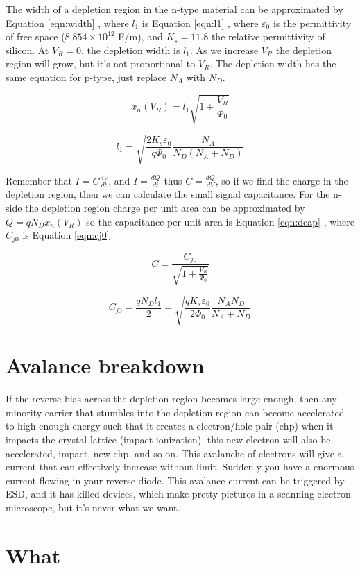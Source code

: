 \documentclass[technote,10pt,a4paper]{IEEEtran}
\newcommand{\req}[1]{Equation \ref{eqn:#1} }
\newcommand{\eqnr}[2]{
  \begin{equation}
    #1
    \label{eqn:#2}
  \end{equation}}
\begin{document}
The width of a depletion region in the n-type material can be approximated by
\req{width}, where $l_{1}$ is \req{l1},
where $\varepsilon_{0}$ is the permittivity of free space
($8.854 \times 10^{12} $ F/m), and $K_{s} = 11.8$ the relative
permittivity of silicon. At $V_{R} = 0$, the depletion width is $l_{1}$. As we
increase $V_{R}$ the depletion region will grow, but it's not proportional to
$V_{R}$. The depletion width has the same equation for  p-type, just
replace $N_{A}$ with $N_{D}$.

\eqnr{ x_n(V_R) = l_1 \sqrt{1 + \frac{V_R}{\Phi_0}} }{width}

\eqnr{ l_1 = \sqrt{\frac{2K_s\varepsilon_0}{q\Phi_0}\frac{N_A}{N_D(N_A +
      N_D)}} }{l1}

Remember that $I = C \frac{dV}{dt}$, and $I = \frac{dQ}{dt}$ thus $ C= \frac{dQ}{dV}$, so if we find the charge in the
depletion region, then we can calculate the small signal capacitance. For the
n-side the depletion region
charge per unit area can be approximated by $Q = qN_D x_n(V_R)$ so the
capacitance per unit area is \req{dcap}, where $C_{j0}$ is \req{cj0}
\eqnr{ C = \frac{C_{j0}}{\sqrt{1 + \frac{V_R}{\Phi_0} } }}{dcap}
\eqnr{ C_{j0} = \frac{qN_D l_1}{2} =
  \sqrt{\frac{qK_s\varepsilon_0}{2\Phi_0}\frac{N_A N_D}{N_A +
      N_D}} }{cj0}

\section{Avalance breakdown}
If the reverse bias across the depletion region becomes large enough, then any
minority carrier that stumbles into the depletion region can become
accelerated to high enough energy such that it creates a electron/hole pair (ehp) when
it impacts the crystal lattice (impact ionization), this new electron will also
be accelerated, impact, new ehp, and so on. This avalanche of electrons will
give a current that can effectively increase without limit. Suddenly you have a
enormous current flowing in your reverse diode. This avalance current can be triggered
by ESD, and it has killed devices, which make pretty pictures in a scanning
electron microscope, but it's never what we want.



\section{What}
\end{document}
